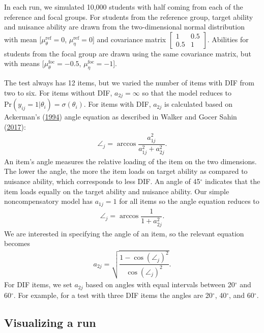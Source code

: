 \documentclass[
  11pt,
]{article}
\begin{document}
In each run, we simulated 10,000 students with half coming from each of the reference and focal groups. For students from the reference group, target ability and nuisance ability are drawn from the two-dimensional normal distribution with mean {[}\(\mu_\theta^\text{ref} = 0\), \(\mu_\eta^\text{ref} = 0\){]} and covariance matrix \(\begin{bmatrix} 1 & 0.5 \\ 0.5 & 1 \end{bmatrix}\). Abilities for students from the focal group are drawn using the same covariance matrix, but with means {[}\(\mu_\theta^\text{foc} = -0.5\), \(\mu_\eta^\text{foc} = -1\){]}.

The test always has 12 items, but we varied the number of items with DIF from two to six. For items without DIF, \(a_{2j} = \infty\) so that the model reduces to \(\text{Pr}(y_{ij} = 1 | \theta_i) = \sigma(\theta_i)\). For items with DIF, \(a_{2j}\) is calculated based on Ackerman's (\protect\hyperlink{ref-ackerman1994using}{1994}) angle equation as described in Walker and Gocer Sahin (\protect\hyperlink{ref-walker2017using}{2017}):
\begin{align}
\angle_j = \arccos \dfrac{a_{1j}^2}{a_{1j}^2 + a_{2j}^2}.
\end{align}
An item's angle measures the relative loading of the item on the two dimensions. The lower the angle, the more the item loads on target ability as compared to nuisance ability, which corresponds to less DIF. An angle of 45\(^\circ\) indicates that the item loads equally on the target ability and nuisance ability. Our simple noncompensatory model has \(a_{1j} = 1\) for all items so the angle equation reduces to
\begin{align}
\angle_j = \arccos \dfrac{1}{1 + a_{2j}^2}.
\end{align}
We are interested in specifying the angle of an item, so the relevant equation becomes
\begin{align}
a_{2j} = \sqrt{\dfrac{1 - \cos(\angle_j)^2}{\cos(\angle_j)^2}}.
\end{align}
For DIF items, we set \(a_{2j}\) based on angles with equal intervals between 20\(^\circ\) and 60\(^\circ\). For example, for a test with three DIF items the angles are 20\(^\circ\), 40\(^\circ\), and 60\(^\circ\).

\hypertarget{visualizing-a-run}{%
\subsection{Visualizing a run}\label{visualizing-a-run}}
\end{document}
